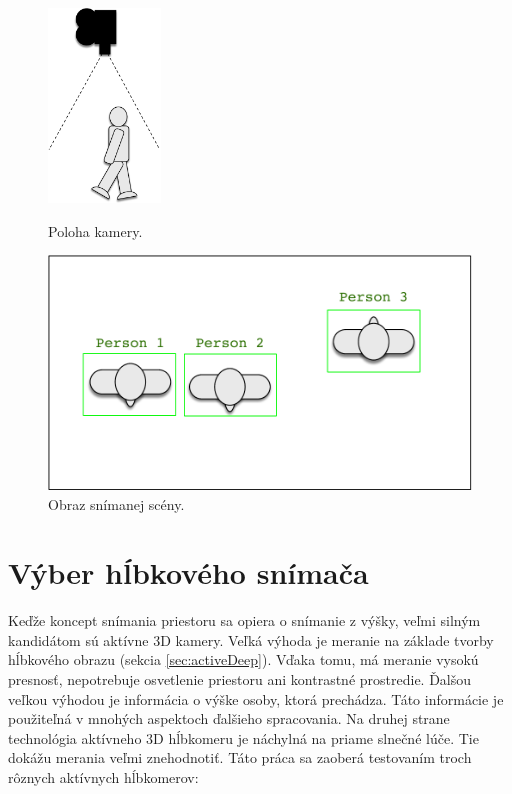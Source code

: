 \begin{figure}[H]
    \centering
    \begin{minipage}[p]{0.49\textwidth}
        \centering
        \includegraphics[width=3cm]{images/conceptCameraPos}
        \caption{Poloha kamery.}
    \end{minipage}
    \hfill
    \begin{minipage}[p]{0.49\textwidth}
        \centering
        \includegraphics[width=\textwidth]{images/conturesConcept}
        \caption{Obraz snímanej scény.}
    \end{minipage}
\end{figure}


\section{Výber hĺbkového snímača}
Keďže  koncept snímania priestoru sa opiera o snímanie z výšky, veľmi silným kandidátom sú aktívne 3D kamery. Veľká výhoda je meranie na základe tvorby hĺbkového obrazu (sekcia \ref{sec:activeDeep}). Vďaka tomu, má meranie vysokú presnosť, nepotrebuje osvetlenie priestoru ani kontrastné prostredie. Ďalšou veľkou výhodou je informácia o výške osoby, ktorá prechádza. Táto informácie je použiteľná v mnohých aspektoch ďalšieho spracovania. Na druhej strane technológia aktívneho 3D hĺbkomeru je náchylná na priame slnečné lúče. Tie dokážu merania veľmi znehodnotiť. Táto práca sa zaoberá testovaním troch rôznych aktívnych hĺbkomerov: 

